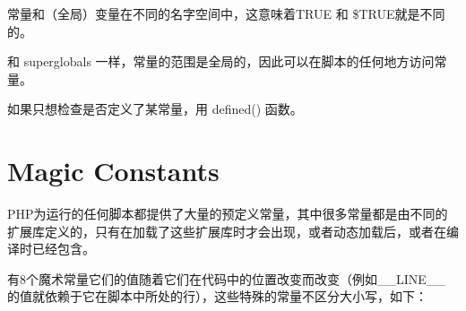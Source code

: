 常量和（全局）变量在不同的名字空间中，这意味着TRUE 和 \$TRUE就是不同的。

和 superglobals 一样，常量的范围是全局的，因此可以在脚本的任何地方访问常量。


如果只想检查是否定义了某常量，用 defined() 函数。











\section{Magic Constants}


PHP为运行的任何脚本都提供了大量的预定义常量，其中很多常量都是由不同的扩展库定义的，只有在加载了这些扩展库时才会出现，或者动态加载后，或者在编译时已经包含。

有8个魔术常量它们的值随着它们在代码中的位置改变而改变（例如\_\_LINE\_\_ 的值就依赖于它在脚本中所处的行），这些特殊的常量不区分大小写，如下：

